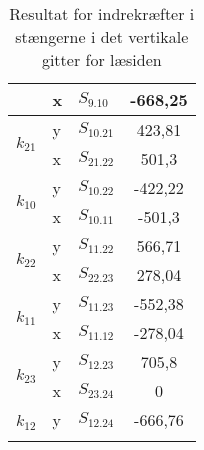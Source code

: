 \begin{table}[htbp]
\begin{tabular}{|c|l|l|c|}
                          & x                  & $S_{9.10}$            & -668,25           \\ \hline
\multirow{2}{*}{$k_{21}$} & y                  & $S_{10.21}$           & 423,81           \\ \cline{2-4} 
                          & x                  & $S_{21.22}$           & 501,3          \\ \hline
\multirow{2}{*}{$k_{10}$} & y                  & $S_{10.22}$           & -422,22           \\ \cline{2-4} 
                          & x                  & $S_{10.11}$           & -501,3       \\ \hline
\multirow{2}{*}{$k_{22}$} & y                  & $S_{11.22}$           & 566,71            \\ \cline{2-4} 
                          & x                  & $S_{22.23}$           & 278,04         \\ \hline
\multirow{2}{*}{$k_{11}$} & y                  & $S_{11.23}$           & -552,38           \\ \cline{2-4} 
                          & x                  & $S_{11.12}$           & -278,04          \\ \hline
\multirow{2}{*}{$k_{23}$} & y                  & $S_{12.23}$           & 705,8           \\ \cline{2-4} 
                          & x                  & $S_{23.24}$           & 0                 \\ \hline
\multirow{2}{*}{$k_{12}$} & y                  & $S_{12.24}$           & -666,76           \\ \cline{2-4} 
                          &                    &                       &                   \\ \hline
\end{tabular}
\caption{Resultat for indrekræfter i stængerne i det vertikale gitter for læsiden}
\label{tab:Indrekrafterle}
\end{table}

